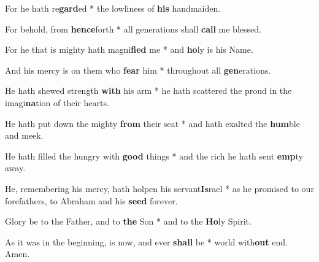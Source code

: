 \begin{multicols}{2}
	For he hath re\textbf{gard}ed * the lowliness of \textbf{his} handmaiden.
	
	For behold, from \textbf{hence}forth * all  generations shall \textbf{call} me blessed.
	
	For he that is mighty hath magni\textbf{fied} me * and \textbf{ho}ly is his Name.
	
	And his mercy is on them who \textbf{fear} him * throughout all \textbf{gen}erations.
	
	He hath shewed strength \textbf{with} his arm * he hath scattered the proud in the imagi\textbf{na}tion of their hearts.
	
	He hath put down the mighty \textbf{from} their seat * and hath exalted the \textbf{hum}ble and meek.
	
	He hath filled the hungry with \textbf{good} things * and the rich he hath sent \textbf{emp}ty away.
	
	He, remembering his mercy, hath holpen his servant\textbf{Is}rael * as he promised to our forefathers, to Abraham and his \textbf{seed} forever.
	
	Glory be to the Father, and to \textbf{the} Son * and to the \textbf{Ho}ly Spirit.
	
	As it was in the beginning, is now, and ever \textbf{shall} be * world with\textbf{out} end. Amen.
\end{multicols}